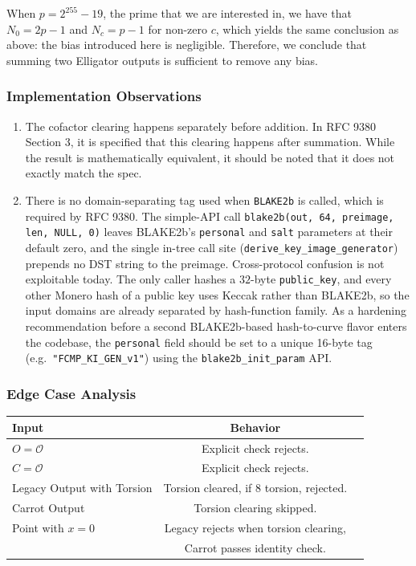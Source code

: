 \documentclass[12pt,titlepage,table]{article}
\begin{document}
\medskip
When $p = 2^{255}-19$, the prime that we are interested in, we have that $N_0 = 2p-1$ and $N_c = p - 1$ for non-zero $c$, which yields the same conclusion as above: the bias introduced here is negligible. Therefore, we conclude that summing two Elligator outputs is sufficient to remove any bias.


\subsubsection{Implementation Observations}
\begin{enumerate}
    \item The cofactor clearing happens separately before addition. In RFC 9380 Section 3, it is specified that this clearing happens after summation. While the result is mathematically equivalent, it should be noted that it does not exactly match the spec.
    \item There is no domain-separating tag used when \verb+BLAKE2b+ is called, which is required by RFC 9380.  The simple-API call \verb+blake2b(out, 64, preimage, len, NULL, 0)+ leaves BLAKE2b's \verb+personal+ and \verb+salt+ parameters at their default zero, and the single in-tree call site (\verb+derive_key_image_generator+) prepends no DST string to the preimage.  Cross-protocol confusion is not exploitable today. The only caller hashes a $32$-byte \verb+public_key+, and every other Monero hash of a public key uses Keccak rather than BLAKE2b, so the input domains are already separated by hash-function family.  As a hardening recommendation before a second BLAKE2b-based hash-to-curve flavor enters the codebase, the \verb+personal+ field should be set to a unique 16-byte tag (e.g.\ \verb+"FCMP_KI_GEN_v1"+) using the \verb+blake2b_init_param+ API.

\end{enumerate}

\subsubsection{Edge Case Analysis}

\begin{table}[htbp]
\centering
{
\begin{tabular}{| l | c | l|}
\hline
\textbf{Input} & \textbf{Behavior} \\
\hline
\hline
$O = \mathcal{O}$ & Explicit check rejects. \\
$C = \mathcal{O}$ & Explicit check rejects.\\
Legacy Output with Torsion & Torsion cleared, if 8 torsion, rejected. \\
Carrot Output & Torsion clearing skipped. \\
Point with $x = 0$ & Legacy rejects when torsion clearing, \\
& Carrot passes identity check. \\
\hline
\end{tabular}}
\end{table}
\end{document}
